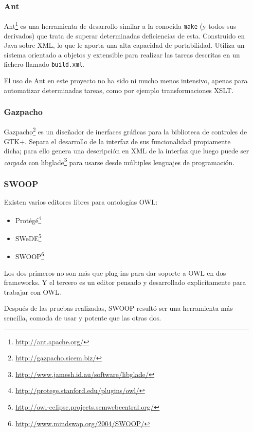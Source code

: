 \subsubsection{Ant}

Ant\footnote{\url{http://ant.apache.org/}} es una herramienta de desarrollo 
similar a la conocida \texttt{make} (y todos sus derivados) que trata de 
superar determinadas deficiencias de esta. Construido en Java sobre XML, 
lo que le aporta una alta capacidad de portabilidad. Utiliza un sistema 
orientado a objetos y extensible para realizar las tareas descritas en un 
fichero llamado \texttt{build.xml}.

El uso de Ant en este proyecto no ha sido ni mucho menos intensivo, apenas para
automatizar determinadas tareas, como por ejemplo transformaciones XSLT.

\subsubsection{Gazpacho}

Gazpacho\footnote{\url{http://gazpacho.sicem.biz/}} es un diseñador de inerfaces
gráficas para la biblioteca de controles de GTK+. Separa el desarrollo de la interfaz
de sus funcionalidad propiamente dicha; para ello genera una descripción en XML
de la interfaz que luego puede ser \emph{cargada} con 
libglade\footnote{\url{http://www.jamesh.id.au/software/libglade/}} para usarse
desde múltiples lenguajes de programación.

\subsubsection{SWOOP}

Existen varios editores libres para ontologías OWL:

\begin{itemize}
  \item Protégé\footnote{\url{http://protege.stanford.edu/plugins/owl/}}
  \item SWeDE\footnote{\url{http://owl-eclipse.projects.semwebcentral.org/}}
  \item SWOOP\footnote{\url{http://www.mindswap.org/2004/SWOOP/}}
\end{itemize}

Los dos primeros no son más que plug-ins para dar soporte a OWL en dos 
frameworks. Y el tercero es un editor pensado y desarrollado explicitamente
para trabajar con OWL.

Después de las pruebas realizadas, SWOOP resultó ser una herramienta más sencilla,
comoda de usar y potente que las otras dos.

